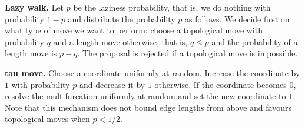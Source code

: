 \documentclass{amsart}
\begin{document}
{\bf Lazy walk.} Let $p$ be the laziness probability, that is, we do nothing
with probability $1-p$ and distribute the probability $p$ as follows.
We decide first on what type of move we want to perform: choose a topological
move with probability $q$ and a length move otherwise, that is, $q \leq p$
and the probability of a length move is $p-q$. The proposal is rejected if
a topological move is impossible.

{\bf tau move.} Choose a coordinate uniformly at random. Increase the
coordinate by $1$ with probability $p$ and decrease it by $1$ otherwise.
If the coordinate becomes $0$, resolve the multifurcation uniformly at
random and set the new coordinate to $1$. Note that this mechanism
does not bound edge lengths from above and favours topological moves when
$p<1/2$.



\end{document}
